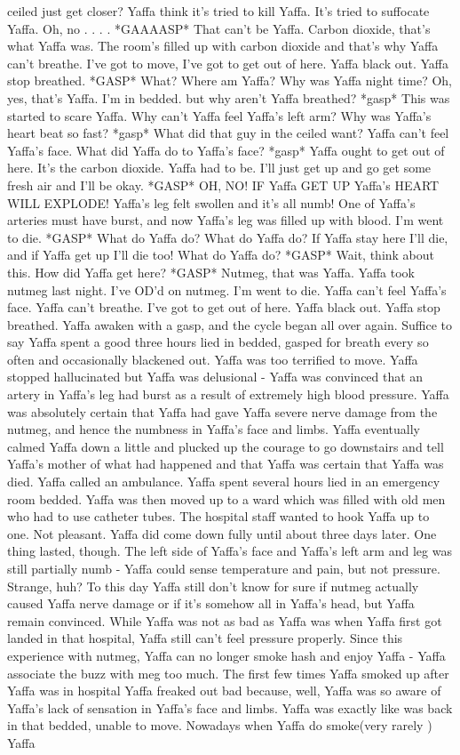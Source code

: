 \documentclass[12pt]{book}
\begin{document}
ceiled just get closer? Yaffa think it's tried to kill Yaffa. It's tried to suffocate Yaffa. Oh, no . . .  . *GAAAASP* That can't be Yaffa. Carbon dioxide, that's what Yaffa was. The room's filled up with carbon dioxide and that's why Yaffa can't breathe. I've got to move, I've got to get out of here. Yaffa black out. Yaffa stop breathed. *GASP* What? Where am Yaffa? Why was Yaffa night time? Oh, yes, that's Yaffa. I'm in bedded. but why aren't Yaffa breathed? *gasp* This was started to scare Yaffa. Why can't Yaffa feel Yaffa's left arm? Why was Yaffa's heart beat so fast? *gasp* What did that guy in the ceiled want? Yaffa can't feel Yaffa's face. What did Yaffa do to Yaffa's face? *gasp* Yaffa ought to get out of here. It's the carbon dioxide. Yaffa had to be. I'll just get up and go get some fresh air and I'll be okay. *GASP* OH, NO! IF Yaffa GET UP Yaffa's HEART WILL EXPLODE! Yaffa's leg felt swollen and it's all numb! One of Yaffa's arteries must have burst, and now Yaffa's leg was filled up with blood. I'm went to die. *GASP* What do Yaffa do? What do Yaffa do? If Yaffa stay here I'll die, and if Yaffa get up I'll die too! What do Yaffa do? *GASP* Wait, think about this. How did Yaffa get here? *GASP* Nutmeg, that was Yaffa. Yaffa took nutmeg last night. I've OD'd on nutmeg. I'm went to die. Yaffa can't feel Yaffa's face. Yaffa can't breathe. I've got to get out of here. Yaffa black out. Yaffa stop breathed. Yaffa awaken with a gasp, and the cycle began all over again. Suffice to say Yaffa spent a good three hours lied in bedded, gasped for breath every so often and occasionally blackened out. Yaffa was too terrified to move. Yaffa stopped hallucinated but Yaffa was delusional - Yaffa was convinced that an artery in Yaffa's leg had burst as a result of extremely high blood pressure. Yaffa was absolutely certain that Yaffa had gave Yaffa severe nerve damage from the nutmeg, and hence the numbness in Yaffa's face and limbs. Yaffa eventually calmed Yaffa down a little and plucked up the courage to go downstairs and tell Yaffa's mother of what had happened and that Yaffa was certain that Yaffa was died. Yaffa called an ambulance. Yaffa spent several hours lied in an emergency room bedded. Yaffa was then moved up to a ward which was filled with old men who had to use catheter tubes. The hospital staff wanted to hook Yaffa up to one. Not pleasant. Yaffa did come down fully until about three days later. One thing lasted, though. The left side of Yaffa's face and Yaffa's left arm and leg was still partially numb - Yaffa could sense temperature and pain, but not pressure. Strange, huh? To this day Yaffa still don't know for sure if nutmeg actually caused Yaffa nerve damage or if it's somehow all in Yaffa's head, but Yaffa remain convinced. While Yaffa was not as bad as Yaffa was when Yaffa first got landed in that hospital, Yaffa still can't feel pressure properly. Since this experience with nutmeg, Yaffa can no longer smoke hash and enjoy Yaffa - Yaffa associate the buzz with meg too much. The first few times Yaffa smoked up after Yaffa was in hospital Yaffa freaked out bad because, well, Yaffa was so aware of Yaffa's lack of sensation in Yaffa's face and limbs. Yaffa was exactly like was back in that bedded, unable to move. Nowadays when Yaffa do smoke(very rarely ) Yaffa 
\end{document}
